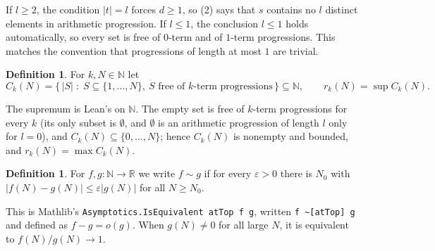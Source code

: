 \documentclass[11pt]{amsart}
\theoremstyle{plain}
\theoremstyle{definition}
\newtheorem{definition}[theorem]{Definition}
\newcommand{\N}{\mathbb{N}}
\newcommand{\R}{\mathbb{R}}
\begin{document}
If $l\ge 2$, the condition $|t|=l$ forces $d\ge 1$, so (2) says that $s$ contains no $l$ distinct elements in arithmetic progression. If $l\le 1$, the conclusion $l\le 1$ holds automatically, so every set is free of $0$-term and of $1$-term progressions. This matches the convention that progressions of length at most $1$ are trivial.

\begin{definition}\label{def:r}
For $k,N\in\N$ let
\[
C_k(N)=\bigl\{\,|S| \;:\; S\subseteq\{1,\dots,N\},\ S \text{ free of $k$-term progressions}\,\bigr\}\subseteq\N,
\qquad r_k(N)=\sup C_k(N).
\]
\end{definition}

The supremum is Lean's  on $\N$. The empty set is free of $k$-term progressions for every $k$ (its only subset is $\emptyset$, and $\emptyset$ is an arithmetic progression of length $l$ only for $l=0$), and $C_k(N)\subseteq\{0,\dots,N\}$; hence $C_k(N)$ is nonempty and bounded, and $r_k(N)=\max C_k(N)$.

\begin{definition}\label{def:equiv}
For $f,g\colon\N\to\R$ we write $f\sim g$ if for every $\varepsilon>0$ there is $N_0$ with $|f(N)-g(N)|\le\varepsilon|g(N)|$ for all $N\ge N_0$.
\end{definition}

This is Mathlib's \texttt{Asymptotics.IsEquivalent atTop f g}, written \texttt{f \textasciitilde[atTop] g} and defined as $f-g=o(g)$. When $g(N)\ne 0$ for all large $N$, it is equivalent to $f(N)/g(N)\to 1$.
\end{document}
